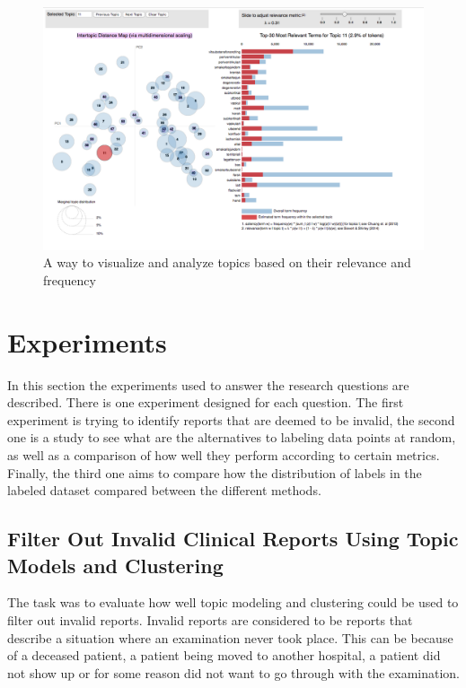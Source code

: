 \begin{figure}
    \centering
    \includegraphics[scale=0.3]{figures/ldavis-sample.png}
    \caption{A way to visualize and analyze topics based on their relevance and frequency}
    \label{fig:ldavis-sample}
\end{figure}

\section{Experiments}\label{sec:exp1-method}
In this section the experiments used to answer the research questions are described.
There is one experiment designed for each question.
The first experiment is trying to identify reports that are deemed to be invalid, the second one is a study to see what are the alternatives to labeling data points at random, as well as a comparison of how well they perform according to certain metrics.
Finally, the third one aims to compare how the distribution of labels in the labeled dataset compared between the different methods.

\subsection{Filter Out Invalid Clinical Reports Using Topic Models and Clustering}

The task was to evaluate how well topic modeling and clustering could be used to filter out invalid reports.
Invalid reports are considered to be reports that describe a situation where an examination never took place.
This can be because of a deceased patient, a patient being moved to another hospital, a patient did not show up or for some reason did not want to go through with the examination.

